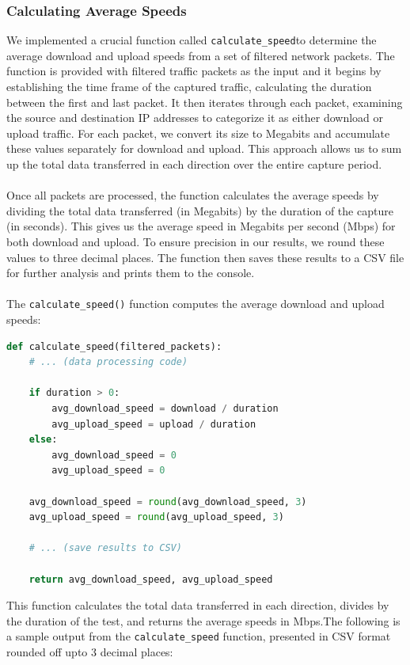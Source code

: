 \documentclass{article}
\begin{document}
\subsubsection{Calculating Average Speeds}
We implemented a crucial function called \verb|calculate_speed|to determine the average download and upload speeds from a set of filtered network packets. The function is provided with filtered traffic packets as the input and it begins by establishing the time frame of the captured traffic, calculating the duration between the first and last packet. It then iterates through each packet, examining the source and destination IP addresses to categorize it as either download or upload traffic. For each packet, we convert its size to Megabits and accumulate these values separately for download and upload. This approach allows us to sum up the total data transferred in each direction over the entire capture period.
\\\\
Once all packets are processed, the function calculates the average speeds by dividing the total data transferred (in Megabits) by the duration of the capture (in seconds). This gives us the average speed in Megabits per second (Mbps) for both download and upload. To ensure precision in our results, we round these values to three decimal places. The function then saves these results to a CSV file for further analysis and prints them to the console. 
\\\\
The \texttt{calculate\_speed()} function computes the average download and upload speeds:

\begin{lstlisting}[language=Python]
def calculate_speed(filtered_packets):
    # ... (data processing code)
    
    if duration > 0:
        avg_download_speed = download / duration
        avg_upload_speed = upload / duration
    else:
        avg_download_speed = 0
        avg_upload_speed = 0

    avg_download_speed = round(avg_download_speed, 3)
    avg_upload_speed = round(avg_upload_speed, 3)
    
    # ... (save results to CSV)
    
    return avg_download_speed, avg_upload_speed
\end{lstlisting}

This function calculates the total data transferred in each direction, divides by the duration of the test, and returns the average speeds in Mbps.The following is a sample output from the \texttt{calculate\_speed} function, presented in CSV format rounded off upto 3 decimal places:
\end{document}
